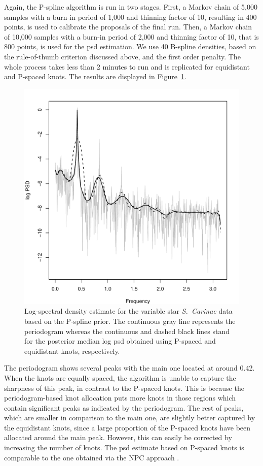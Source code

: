 \documentclass[twocolumn,final]{svjour3}
\begin{document}
Again, the P-spline algorithm is run in two stages.  First, a Markov chain of 5,000 samples with a burn-in period of 1,000 and thinning factor of 10, resulting in 400 points, is used to calibrate the proposals of the final run.  Then, a Markov chain of 10,000 samples with a burn-in period of 2,000 and thinning factor of 10, that is 800 points, is used for the psd estimation.  We use 40 B-spline densities,  based on the rule-of-thumb criterion discussed above, and the first order penalty.  The whole process takes less than 2 minutes to run and is replicated for equidistant and P-spaced knots. The results are displayed in Figure~\ref{fig:carinae}.

\begin{figure}[]
	\centering
	\includegraphics[scale=0.4,clip=true,angle=0]{carinae.pdf}
	\caption{Log-spectral density estimate for the variable star {\it S.\ Carinae} data based on the P-spline prior. The continuous gray line represents the periodogram whereas the continuous and dashed black lines stand for the posterior median log psd obtained using P-spaced and equidistant knots, respectively.}
	\label{fig:carinae}
\end{figure}

The periodogram shows several peaks with the main one located at around 0.42.  When the knots are equally spaced, the algorithm is unable to capture the sharpness of this peak,
in contrast to the P-spaced knots.  This is because the periodogram-based knot allocation puts more knots in those regions which contain significant peaks as indicated by the periodogram.  The rest of peaks, which are smaller in comparison to the main one, are slightly better captured by the equidistant knots, since a large proportion of the P-spaced knots have been allocated around the main peak. However, this can easily  be corrected by increasing the number of knots.  The psd estimate based on P-spaced knots is comparable to the one obtained via the NPC approach \citep{Kirch:2018}.
\end{document}

